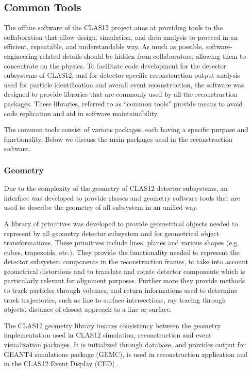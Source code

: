 \subsection{Common Tools}
\label{common-tools}

﻿The offline software of the CLAS12 project aims at providing tools to
the collaboration that allow design, simulation, and data analysis to proceed
in an efficient, repeatable, and understandable way. As much as
possible, software-engineering-related details should be hidden from
collaborators, allowing them to concentrate on the physics.
To facilitate code development for the detector subsystems of CLAS12, and for detector-specific reconstruction output
analysis used for particle identification and overall event reconstruction,
the software was designed to provide libraries that are commonly used by all the reconstruction
packages.  These libraries, referred to as ``common tools'' provide means to avoid code replication and aid in software maintainability.

The common tools consist of various packages, each having a specific purpose and functionality. Below we discuss
the main packages used in the reconstruction software.

\subsubsection{Geometry}

Due to the complexity of the geometry of CLAS12 detector subsystems, an interface was developed
to provide classes and geometry software tools that are used to describe the geometry of all subsystem in an unified way.

A library of primitives was developed to provide geometrical objects needed to represent by all geometry detector subsystem
and for geometrical object transformations.  These primitives include lines, planes and various shapes (e.g.
cubes, trapezoids, etc.).  They provide the functionality needed
to represent the detector subsystem components in the reconstruction frames, to take into account geometrical distortions
and to translate and rotate detector components which is particularly relevant for alignment purposes.
Further more they provide methods to track particles through volumes, and return informations used to determine
track trajectories,
such as line to surface intersections, ray tracing through objects, distance of closest approach to a line or surface.

The CLAS12 geometry library insures consistency between the geometry implementation used in CLAS12 simulation, reconstruction and
event visualization packages. It is initialized through database, and provides output for GEANT4 simulations package
(GEMC), is used in reconstruction application and in the CLAS12 Event Display (CED) .

